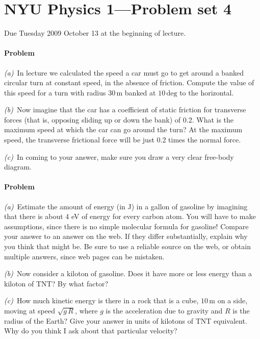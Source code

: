 \documentclass[12pt]{article}
\renewcommand{\deg}{\mathrm{deg}}
\newcommand{\m}{\mathrm{m}}
\newcounter{problem}
\begin{document}
\thispagestyle{empty}

\section*{NYU Physics 1---Problem set 4}

Due Tuesday 2009 October 13 at the beginning of lecture.

\paragraph{Problem~\theproblem}%
\textsl{(a)}~In lecture we calculated the speed a car must go to get
around a banked circular turn at constant speed, in the absence of
friction.  Compute the value of this speed for a turn with radius
$30\,\m$ banked at $10\,\deg$ to the horizontal.

\textsl{(b)}~Now imagine that the car has a coefficient of static
friction for transverse forces (that is, opposing sliding up or down
the bank) of 0.2.  What is the maximum speed at which the car can go
around the turn?  At the maximum speed, the transverse frictional
force will be just 0.2 times the normal force.

\textsl{(c)}~In coming to your answer, make sure you draw a very clear
free-body diagram.

\paragraph{Problem~\theproblem}%
\textsl{(a)}~Estimate the amount of energy (in J) in a gallon of
gasoline by imagining that there is about 4 eV of energy for every
carbon atom.  You will have to make assumptions, since there is no
simple molecular formula for gasoline!  Compare your answer to an
answer on the web.  If they differ substantially, explain why you
think that might be.  Be sure to use a reliable source on the web, or
obtain multiple answers, since web pages can be mistaken.

\textsl{(b)}~Now consider a kiloton of gasoline.  Does it have more or
less energy than a kiloton of TNT?  By what factor?

\textsl{(c)}~How much kinetic energy is there in a rock that is a
cube, $10\,\m$ on a side, moving at speed $\sqrt{g\,R}$, where $g$ is
the acceleration due to gravity and $R$ is the radius of the Earth?
Give your answer in units of kilotons of TNT equivalent.  Why do you
think I ask about that particular velocity?
\end{document}
